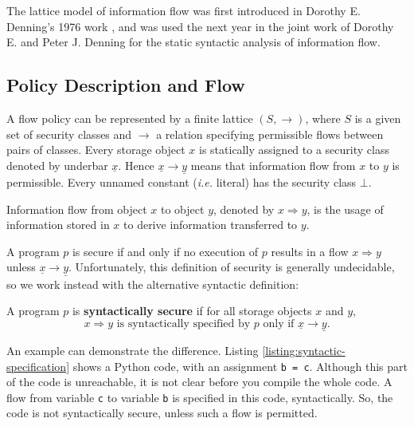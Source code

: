 \documentclass{llncs}
\begin{document}
The lattice model of information flow was first introduced in Dorothy E. Denning's 1976 work \cite{Denning76}, and was used the next year in the joint work of Dorothy E. and Peter J. Denning \cite{Denning77} for the static syntactic analysis of information flow.

\subsection{Policy Description and Flow}

A flow policy can be represented by a finite lattice $(S, \rightarrow)$, where $S$ is a given set of security classes and $\rightarrow$ a relation specifying permissible flows between pairs of classes. Every storage object $x$ is statically assigned to a security class denoted by underbar $\underline{x}$. Hence $\underline{x} \rightarrow \underline{y}$ means that information flow from $x$ to $y$ is permissible. Every unnamed constant (\textit{i.e.} literal) has the security class $\bot$.

\begin{definition}
Information flow from object $x$ to object $y$, denoted by $x \Rightarrow y$, is the usage of information stored in $x$ to derive information transferred to $y$.
\end{definition}

A program $p$ is secure if and only if no execution of $p$ results in a flow $x \Rightarrow y$ unless $\underline{x} \rightarrow \underline{y}$. Unfortunately, this definition of security is generally undecidable, so we work instead with the alternative syntactic definition:

\begin{definition}
A program $p$ is \textbf{syntactically secure} if for all storage objects $x$ and $y$,
\begin{equation}
    x \Rightarrow y \mbox{ is syntactically specified by $p$ only if } \underline{x} \rightarrow \underline{y}.
\end{equation}
\end{definition}

An example can demonstrate the difference. Listing \ref{listing:syntactic-specification} shows a Python code, with an assignment \texttt{b = c}. Although this part of the code is unreachable, it is not clear before you compile the whole code. A flow from variable \texttt{c} to variable \texttt{b} is specified in this code, syntactically. So, the code is not syntactically secure, unless such a flow is permitted.
\end{document}
